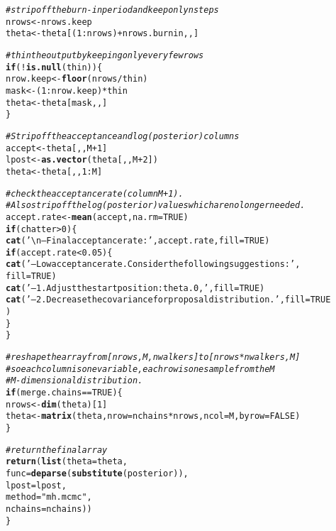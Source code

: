 \documentclass{article}\usepackage[]{graphicx}\usepackage[]{color}
\makeatletter
\newcommand{\hlnum}[1]{\textcolor[rgb]{0.686,0.059,0.569}{#1}}%
\newcommand{\hlstr}[1]{\textcolor[rgb]{0.192,0.494,0.8}{#1}}%
\newcommand{\hlcom}[1]{\textcolor[rgb]{0.678,0.584,0.686}{\textit{#1}}}%
\newcommand{\hlopt}[1]{\textcolor[rgb]{0,0,0}{#1}}%
\newcommand{\hlstd}[1]{\textcolor[rgb]{0.345,0.345,0.345}{#1}}%
\newcommand{\hlkwa}[1]{\textcolor[rgb]{0.161,0.373,0.58}{\textbf{#1}}}%
\newcommand{\hlkwb}[1]{\textcolor[rgb]{0.69,0.353,0.396}{#1}}%
\newcommand{\hlkwc}[1]{\textcolor[rgb]{0.333,0.667,0.333}{#1}}%
\newcommand{\hlkwd}[1]{\textcolor[rgb]{0.737,0.353,0.396}{\textbf{#1}}}%
\newenvironment{kframe}{%
 \def\at@end@of@kframe{}%
 \ifinner\ifhmode%
  \def\at@end@of@kframe{\end{minipage}}%
  \begin{minipage}{\columnwidth}%
 \fi\fi%
 \def\FrameCommand##1{\hskip\@totalleftmargin \hskip-\fboxsep
 \colorbox{shadecolor}{##1}\hskip-\fboxsep
     \hskip-\linewidth \hskip-\@totalleftmargin \hskip\columnwidth}%
 \MakeFramed {\advance\hsize-\width
   \@totalleftmargin\z@ \linewidth\hsize
   \@setminipage}}%
 {\par\unskip\endMakeFramed%
 \at@end@of@kframe}
\newenvironment{knitrout}{}{} %
\makeatother
\begin{document}
\begin{knitrout}
\begin{kframe}
\begin{alltt}
  \hlcom{# strip off the burn-in period and keep only nsteps }
  \hlstd{nrows} \hlkwb{<-} \hlstd{nrows.keep}
  \hlstd{theta} \hlkwb{<-} \hlstd{theta[(}\hlnum{1}\hlopt{:}\hlstd{nrows)} \hlopt{+} \hlstd{nrows.burnin, , ]}

  \hlcom{# thin the output by keeping only every few rows}
  \hlkwa{if} \hlstd{(}\hlopt{!}\hlkwd{is.null}\hlstd{(thin)) \{}
    \hlstd{nrow.keep} \hlkwb{<-} \hlkwd{floor}\hlstd{(nrows} \hlopt{/} \hlstd{thin)}
    \hlstd{mask} \hlkwb{<-} \hlstd{(}\hlnum{1}\hlopt{:}\hlstd{nrow.keep)} \hlopt{*} \hlstd{thin}
    \hlstd{theta} \hlkwb{<-} \hlstd{theta[mask, , ]}
  \hlstd{\}}

  \hlcom{# Strip off the acceptance and log(posterior) columns }
  \hlstd{accept} \hlkwb{<-} \hlstd{theta[, , M}\hlopt{+}\hlnum{1}\hlstd{]}
  \hlstd{lpost} \hlkwb{<-} \hlkwd{as.vector}\hlstd{( theta[, , M}\hlopt{+}\hlnum{2}\hlstd{])}
  \hlstd{theta} \hlkwb{<-} \hlstd{theta[, ,} \hlnum{1}\hlopt{:}\hlstd{M]}

  \hlcom{# check the acceptance rate (column M+1).}
  \hlcom{# Also strip off the log(posterior) values which are no longer needed.}
  \hlstd{accept.rate} \hlkwb{<-} \hlkwd{mean}\hlstd{(accept,} \hlkwc{na.rm} \hlstd{=} \hlnum{TRUE}\hlstd{)}
  \hlkwa{if} \hlstd{(chatter} \hlopt{>} \hlnum{0}\hlstd{) \{}
    \hlkwd{cat}\hlstd{(}\hlstr{'\textbackslash{}n-- Final acceptance rate: '}\hlstd{, accept.rate,} \hlkwc{fill} \hlstd{=} \hlnum{TRUE}\hlstd{)}
    \hlkwa{if} \hlstd{(accept.rate} \hlopt{<} \hlnum{0.05}\hlstd{) \{}
      \hlkwd{cat}\hlstd{(}\hlstr{'-- Low acceptance rate. Consider the following suggestions:'}\hlstd{,}
          \hlkwc{fill} \hlstd{=} \hlnum{TRUE}\hlstd{)}
      \hlkwd{cat}\hlstd{(}\hlstr{'-- 1. Adjust the start position: theta.0,'}\hlstd{,} \hlkwc{fill} \hlstd{=} \hlnum{TRUE}\hlstd{)}
      \hlkwd{cat}\hlstd{(}\hlstr{'-- 2. Decrease the covariance for proposal distribution.'}\hlstd{,} \hlkwc{fill} \hlstd{=} \hlnum{TRUE}
      \hlstd{)}
    \hlstd{\}}
    \hlstd{\}}

  \hlcom{# reshape the array from [nrows, M, nwalkers] to [nrows*nwalkers, M]}
  \hlcom{# so each column is one variable, each row is one sample from the M}
  \hlcom{# M-dimensional distribution.}
  \hlkwa{if} \hlstd{(merge.chains} \hlopt{==} \hlnum{TRUE}\hlstd{) \{}
    \hlstd{nrows} \hlkwb{<-} \hlkwd{dim}\hlstd{(theta)[}\hlnum{1}\hlstd{]}
    \hlstd{theta} \hlkwb{<-} \hlkwd{matrix}\hlstd{(theta,} \hlkwc{nrow} \hlstd{= nchains} \hlopt{*} \hlstd{nrows,} \hlkwc{ncol} \hlstd{= M,} \hlkwc{byrow} \hlstd{=} \hlnum{FALSE}\hlstd{)}
  \hlstd{\}}

  \hlcom{# return the final array}
  \hlkwd{return}\hlstd{(}\hlkwd{list}\hlstd{(}\hlkwc{theta} \hlstd{= theta,}
              \hlkwc{func} \hlstd{=} \hlkwd{deparse}\hlstd{(}\hlkwd{substitute}\hlstd{(posterior)),}
              \hlkwc{lpost} \hlstd{= lpost,}
              \hlkwc{method} \hlstd{=} \hlstr{"mh.mcmc"}\hlstd{,}
              \hlkwc{nchains} \hlstd{= nchains))}
\hlstd{\}}
\end{alltt}
\end{kframe}
\end{knitrout}
\end{document}
